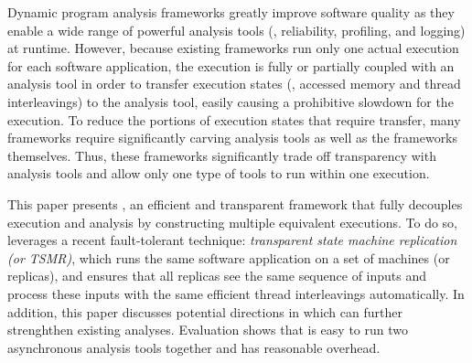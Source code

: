
Dynamic program analysis frameworks greatly improve software quality as
they enable a wide range of powerful analysis tools (\eg, reliability,
profiling, and logging) at runtime. However, because existing frameworks run
only one actual execution for each software application, the execution is fully
or partially coupled with an analysis tool in order to transfer execution states
(\eg, accessed memory and thread interleavings) to the analysis tool, easily
causing a prohibitive slowdown for the execution. To reduce the portions of
execution states that require transfer, many frameworks require significantly
carving analysis tools as well as the frameworks themselves. Thus, these
frameworks significantly trade off transparency with analysis tools and allow
only one type of tools to run within one execution.


This paper presents \xxx, an efficient and transparent framework that fully 
decouples execution and analysis by constructing multiple equivalent 
executions. To do so, \xxx leverages a recent fault-tolerant technique: 
\emph{transparent state machine replication (or TSMR)}, which runs the same 
software application on a set of machines (or replicas), and ensures that 
all replicas see the same sequence of inputs and process these inputs with 
the same efficient thread interleavings automatically. In addition, this paper 
discusses potential directions in which \xxx can further strenghthen existing 
analyses. Evaluation shows that \xxx is easy to run two asynchronous 
analysis tools together and has reasonable overhead.
